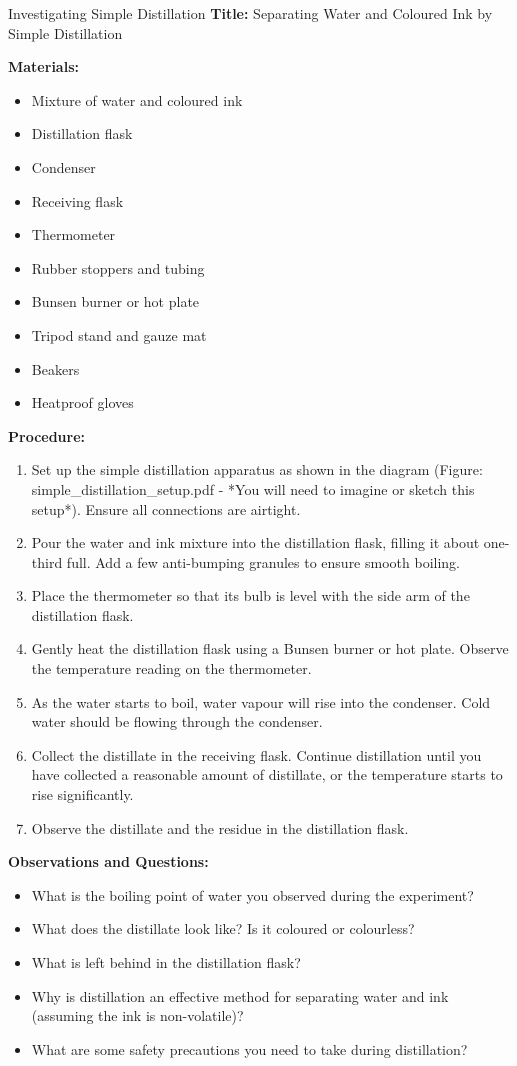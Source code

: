 \begin{investigation}{Investigating Simple Distillation}
\textbf{Title:} Separating Water and Coloured Ink by Simple Distillation

\textbf{Materials:}
\begin{itemize}
    \item Mixture of water and coloured ink
    \item Distillation flask
    \item Condenser
    \item Receiving flask
    \item Thermometer
    \item Rubber stoppers and tubing
    \item Bunsen burner or hot plate
    \item Tripod stand and gauze mat
    \item Beakers
    \item Heatproof gloves
\end{itemize}

\textbf{Procedure:}
\begin{enumerate}
    \item Set up the simple distillation apparatus as shown in the diagram (Figure: simple\_distillation\_setup.pdf - *You will need to imagine or sketch this setup*). Ensure all connections are airtight.
    \item Pour the water and ink mixture into the distillation flask, filling it about one-third full. Add a few anti-bumping granules to ensure smooth boiling.
    \item Place the thermometer so that its bulb is level with the side arm of the distillation flask.
    \item Gently heat the distillation flask using a Bunsen burner or hot plate. Observe the temperature reading on the thermometer.
    \item As the water starts to boil, water vapour will rise into the condenser. Cold water should be flowing through the condenser.
    \item Collect the distillate in the receiving flask. Continue distillation until you have collected a reasonable amount of distillate, or the temperature starts to rise significantly.
    \item Observe the distillate and the residue in the distillation flask.
\end{enumerate}

\textbf{Observations and Questions:}
\begin{itemize}
    \item What is the boiling point of water you observed during the experiment?
    \item What does the distillate look like? Is it coloured or colourless?
    \item What is left behind in the distillation flask?
    \item Why is distillation an effective method for separating water and ink (assuming the ink is non-volatile)?
    \item What are some safety precautions you need to take during distillation?
\end{itemize}


\end{investigation}
